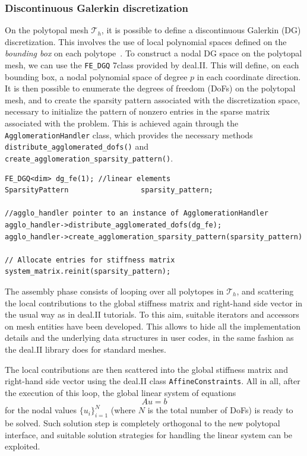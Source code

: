 \documentclass[a4paper,12pt]{article}
\begin{document}
\subsubsection{Discontinuous Galerkin discretization}

On the polytopal mesh $\mathcal{T}_h$, it is possible to define a discontinuous
Galerkin (DG) discretization. This involves the use of local polynomial
spaces defined on the \emph{bounding box} on each polytope~\citep{polyDG}. To construct a nodal
DG space on the polytopal mesh, we can use the \texttt{FE\_DGQ} 7class provided by deal.II. This will define,
on each bounding box, a nodal polynomial space of degree $p$ in each coordinate direction. It is then possible to enumerate
the degrees of freedom (DoFs) on the polytopal mesh, and to
create the sparsity pattern associated with the discretization space, necessary to initialize
the pattern of nonzero entries in the sparse matrix associated with the problem. This is achieved
again through the \texttt{AgglomerationHandler} class, which provides the necessary methods
\texttt{distribute\_agglomerated\_dofs()} and \texttt{create\_agglomeration\_sparsity\_pattern()}.


\begin{lstlisting}[caption=Distribution of DoFs on a polytopal mesh]
FE_DGQ<dim> dg_fe(1); //linear elements
SparsityPattern                 sparsity_pattern;

//agglo_handler pointer to an instance of AgglomerationHandler
agglo_handler->distribute_agglomerated_dofs(dg_fe);
agglo_handler->create_agglomeration_sparsity_pattern(sparsity_pattern)

// Allocate entries for stiffness matrix
system_matrix.reinit(sparsity_pattern);
\end{lstlisting}

The assembly phase consists of looping over all polytopes in $\mathcal{T}_h$, and
scattering the local contributions to the global stiffness matrix and
right-hand side vector in the usual way as in deal.II tutorials.
To this aim, suitable iterators and accessors on mesh entities have been developed. This allows
to hide all the implementation details and the underlying data structures in user codes, in the same fashion
as the deal.II library does for standard meshes.

The local contributions are then scattered into the global
stiffness matrix and right-hand side vector using the deal.II class \texttt{AffineConstraints}. All in all,
after the execution of this loop, the global linear system of equations $$Au = b$$ for the nodal values $\{u_i\}_{i=1}^N$ (where $N$ is the total number
of DoFs) is ready to be solved. Such solution
step is completely orthogonal to the new polytopal interface, and suitable solution strategies for
handling the linear system can be exploited.
\end{document}
